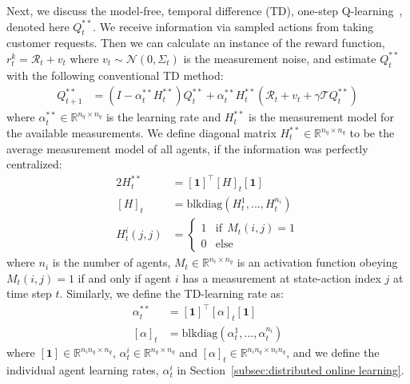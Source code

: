 \documentclass[journal]{IEEEtran}
\begin{document}
Next, we discuss the model-free, temporal difference (TD), one-step Q-learning~\cite{SuttonB98}, denoted here $Q^{**}_t$. We receive information via sampled actions from taking customer requests. Then we can calculate an instance of the reward function, $r^k_t = \mathcal{R}_t + v_t$ where $v_t \sim \mathcal{N}(0, \Sigma_t)$ is the measurement noise, and estimate $Q^{**}_t$ with the following conventional TD method: 
\begin{align}
    Q^{**}_{t+1} &= (I-\alpha^{**}_t H^{**}_t) Q^{**}_{t} + \alpha^{**}_t H^{**}_t (\mathcal{R}_t + v_t + \gamma \mathcal{T} Q^{**}_t)
    \label{eq:td_q}
\end{align}
where $\alpha^{**}_t \in \mathbb{R}^{n_q \times n_q}$ is the learning rate and $H^{**}_t$ is the measurement model for the available measurements. We define diagonal matrix $H^{**}_t \in \mathbb{R}^{n_q \times n_q}$ to be the average measurement model of all agents, if the information was perfectly centralized:
\begin{alignat}{2}
    \label{eq:td_measurement}
    H^{**}_t &= [\boldsymbol{1}]^\intercal [H]_t [\boldsymbol{1}] \\ 
    [H]_t &= \mathrm{blkdiag}( H^1_t, ..., H^{n_i}_t) \nonumber \\ 
    H^i_t(j,j) &= \begin{cases}
        1 & \mathrm{if} \ \ M_t(i,j) = 1 \\
        0 & \mathrm{else}
    \end{cases} \nonumber 
\end{alignat}
where $n_i$ is the number of agents, $M_t \in \mathbb{R}^{n_i \times n_q}$ is an activation function obeying $M_t(i,j) = 1$ if and only if agent $i$ has a measurement at state-action index $j$ at time step $t$. Similarly, we define the TD-learning  rate as: 
\begin{align}
    \label{eq:td_learning_rate}
    \alpha^{**}_t &= [\boldsymbol{1}]^\intercal [\alpha]_t [\boldsymbol{1}] \\ 
    [\alpha]_t &= \mathrm{blkdiag}( \alpha^1_t, ..., \alpha^{n_i}_t) \nonumber
\end{align}
where $[\boldsymbol{1}] \in \mathbb{R}^{n_i n_q \times n_q}$, $\alpha_t^i \in \mathbb{R}^{n_q \times n_q}$ and $[\alpha]_t \in \mathbb{R}^{n_i n_q \times n_i n_q}$, and we define the individual agent learning rates, $\alpha^i_t$ in Section~\ref{subsec:distributed online learning}. 
\end{document}
